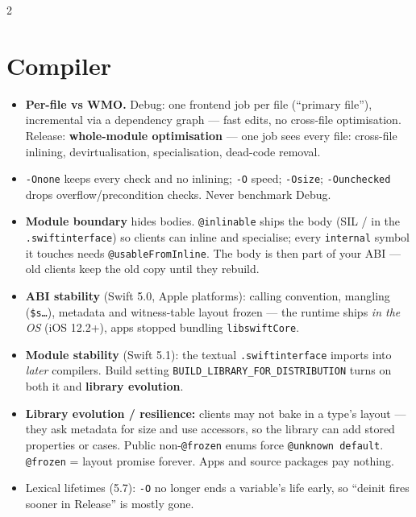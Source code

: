 \documentclass[8pt]{extarticle}
\begin{document}
\begin{multicols}{2}
\raggedright

\section{Compiler}
\begin{itemize}
  \item \textbf{Per-file vs WMO.} Debug: one frontend job per file
        (``primary file''), incremental via a dependency graph — fast
        edits, no cross-file optimisation. Release: \textbf{whole-module
        optimisation} — one job sees every file: cross-file inlining,
        devirtualisation, specialisation, dead-code removal.
  \item \texttt{-Onone} keeps every check and no inlining;
        \texttt{-O} speed; \texttt{-Osize}; \texttt{-Ounchecked} drops
        overflow/precondition checks. Never benchmark Debug.
  \item \textbf{Module boundary} hides bodies. \texttt{@inlinable} ships the
        body (SIL / in the \texttt{.swiftinterface}) so clients can inline and
        specialise; every \texttt{internal} symbol it touches needs
        \texttt{@usableFromInline}. The body is then part of your ABI —
        old clients keep the old copy until they rebuild.
  \item \textbf{ABI stability} (Swift 5.0, Apple platforms): calling
        convention, mangling (\texttt{\$s…}), metadata and witness-table
        layout frozen — the runtime ships \emph{in the OS} (iOS 12.2+), apps
        stopped bundling \texttt{libswiftCore}.
  \item \textbf{Module stability} (Swift 5.1): the textual
        \texttt{.swiftinterface} imports into \emph{later} compilers. Build
        setting \texttt{BUILD\_LIBRARY\_FOR\_\allowbreak DISTRIBUTION} turns on both it and
        \textbf{library evolution}.
  \item \textbf{Library evolution / resilience:} clients may not bake in a
        type's layout — they ask metadata for size and use accessors, so the
        library can add stored properties or cases. Public non-\texttt{@frozen}
        enums force \texttt{@unknown default}. \texttt{@frozen} = layout
        promise forever. Apps and source packages pay nothing.
  \item Lexical lifetimes (5.7): \texttt{-O} no longer ends a variable's life
        early, so ``deinit fires sooner in Release'' is mostly gone.
\end{itemize}


\end{multicols}
\end{document}
